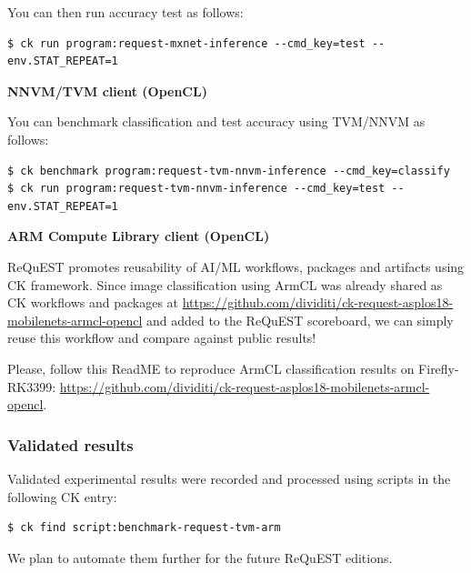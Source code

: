 \documentclass[sigplan]{acmart}
\begin{document}
You can then run accuracy test as follows:

\begin{verbatim} 
$ ck run program:request-mxnet-inference --cmd_key=test --env.STAT_REPEAT=1
\end{verbatim}

\textbf{NNVM/TVM client (OpenCL)}

You can benchmark classification and test accuracy using TVM/NNVM as follows:

\begin{verbatim}
$ ck benchmark program:request-tvm-nnvm-inference --cmd_key=classify
$ ck run program:request-tvm-nnvm-inference --cmd_key=test --env.STAT_REPEAT=1
\end{verbatim}

\textbf{ARM Compute Library client (OpenCL)}

ReQuEST promotes reusability of AI/ML workflows, packages and artifacts using CK framework. 
Since image classification using ArmCL was already shared as CK workflows and packages 
at \url{https://github.com/dividiti/ck-request-asplos18-mobilenets-armcl-opencl} and added to the ReQuEST scoreboard, 
we can simply reuse this workflow and compare against public results!

Please, follow this ReadME to reproduce ArmCL classification results on Firefly-RK3399: 
\url{https://github.com/dividiti/ck-request-asplos18-mobilenets-armcl-opencl}.

\subsubsection{Validated results}

Validated experimental results were recorded and processed using scripts in the following CK entry:

\begin{verbatim}
$ ck find script:benchmark-request-tvm-arm
\end{verbatim}

We plan to automate them further for the future ReQuEST editions.
\end{document}
